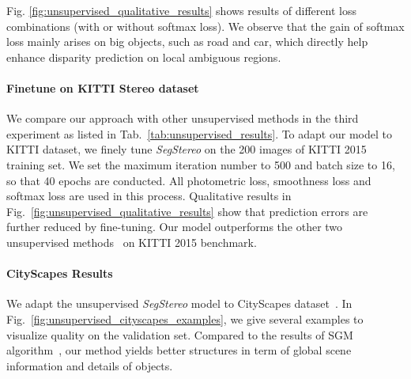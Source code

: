 \documentclass[runningheads]{llncs}
\begin{document}
Fig. \ref{fig:unsupervised_qualitative_results} shows results of different loss combinations (with or without softmax loss). We observe that the gain of softmax loss mainly arises on big objects, such as road and car, which directly help enhance disparity prediction on local ambiguous regions.

\paragraph{\textbf{Finetune on KITTI Stereo dataset}}
We compare our approach with other unsupervised methods in the third experiment as listed in Tab.~\ref{tab:unsupervised_results}. To adapt our model to KITTI dataset, we finely tune \emph{SegStereo} on the 200 images of KITTI 2015 training set. We set the maximum iteration number to 500 and batch size to 16, so that 40 epochs are conducted. All photometric loss, smoothness loss and softmax loss are used in this process. Qualitative results in Fig.~\ref{fig:unsupervised_qualitative_results} show that prediction errors are further reduced by fine-tuning. Our model outperforms the other two unsupervised methods~\cite{zhou2017stereo,monodepth17} on KITTI 2015 benchmark. 

\paragraph{\textbf{CityScapes Results}}  We adapt the unsupervised \emph{SegStereo} model to CityScapes dataset~\cite{cordts2016cityscapes}. In Fig.~\ref{fig:unsupervised_cityscapes_examples}, we give several examples to visualize quality on the validation set. Compared to the results of SGM algorithm~\cite{hirschmuller2008stereo}, our method yields better structures in term of global scene information and details of objects. 
\end{document}
